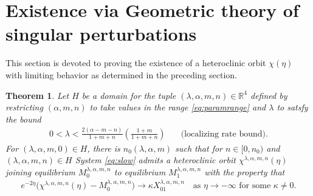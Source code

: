 \documentclass[a4paper,11pt]{article}
\newtheorem{theorem}{Theorem}
\theoremstyle{remark}
\begin{document}
%



\vfil\eject

\section{Existence via Geometric theory of singular perturbations} \label{sec:proof}
This section is devoted to proving the existence of a heteroclinic orbit $\chi(\eta)$ with limiting behavior as determined in the preceding section.

\begin{theorem} \label{thm1}
Let $H$ be a domain for the tuple $(\lambda,\alpha,m,n)\in\mathbb{R}^4$ defined by restricting $(\alpha,m,n)$ to take values in the range
\eqref{eq:paramrange} and $\lambda$ to satsfy the bound
 \begin{align*}
  0< \lambda < \frac{2(\alpha-m-n)}{1+m+n}\left(\frac{1+m}{1+m+n}\right) \quad&\text{(localizing rate bound)}. %
\end{align*}
 For $(\lambda,\alpha,m,0) \in H$, there is $n_0( \lambda,\alpha,m)$ such that for $n \in [0, n_0)$ and $(\lambda,\alpha,m,n) \in H$ System \eqref{eq:slow}  admits a heteroclinic orbit $\chi^{\lambda,\alpha,m,n}(\eta)$ joining equilibrium $M_0^{\lambda,\alpha,m,n}$ to equilibrium $M_1^{\lambda,\alpha,m,n}$ with the property that
    \begin{align} \label{eq:rapid}
        e^{-2\eta}\big(\chi^{\lambda,\alpha,m,n}(\eta) - M_0^{\lambda,\alpha,m,n}\big) \rightarrow \kappa X_{01}^{\lambda,\alpha,m,n} \quad \text{as $\eta \rightarrow -\infty$ for some $\kappa\ne0$}.
    \end{align}
\end{theorem}
\end{document}

